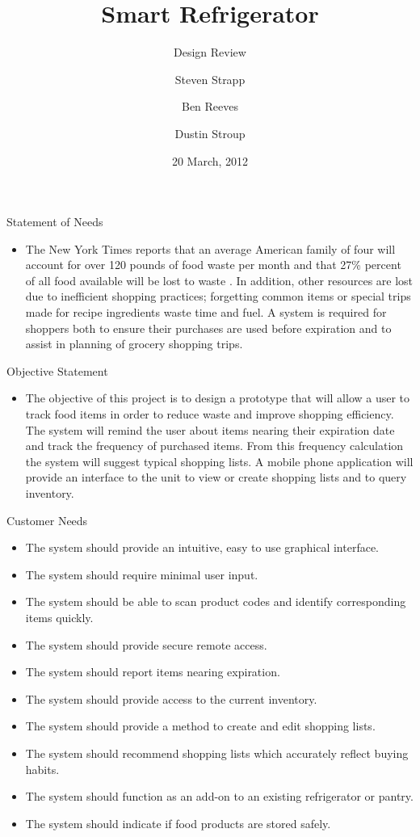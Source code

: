 \documentclass{beamer}
\title[Smart Refrigerator: Design Review] %
{Smart Refrigerator}
\subtitle
{Design Review} %
\author[Steven Strapp, Ben Reeves, Dustin Stroup] %
{Steven Strapp \and Ben Reeves \and Dustin Stroup}
\date[20 March, 2012] %
{20 March, 2012}
\begin{document}
\begin{frame}
  \titlepage
\end{frame}

\begin{frame}{Statement of Needs}
\Large
\begin{itemize}
\item The New York Times reports that an average American family of four will account for over 120 pounds of food waste per month and that 27\% percent of all food available will be lost to waste \cite{times}. In addition, other resources are lost due to inefficient shopping practices; forgetting common items or special trips made for recipe ingredients waste time and fuel. A system is required for shoppers both to ensure their purchases are used before expiration and to assist in planning of grocery shopping trips.
\end{itemize}
\end{frame}

\begin{frame}{Objective Statement}
\Large
\begin{itemize}
\item The objective of this project is to design a prototype that will allow a user to track food items in order to reduce waste and improve shopping efficiency. The system will remind the user about items nearing their expiration date and track the frequency of purchased items. From this frequency calculation the system will suggest typical shopping lists. A mobile phone application will provide an interface to the unit to view or create shopping lists and to query inventory.
\end{itemize}
\end{frame}

\begin{frame}{Customer Needs}
\footnotesize
\begin{itemize}
\item The system should provide an intuitive, easy to use graphical interface.
\item The system should require minimal user input.
\item The system should be able to scan product codes and identify corresponding items quickly.
\item The system should provide secure remote access.
\item The system should report items nearing expiration.
\item The system should provide access to the current inventory.
\item The system should provide a method to create and edit shopping lists.
\item The system should recommend shopping lists which accurately reflect buying habits.
\item The system should function as an add-on to an existing refrigerator or pantry.
\item The system should indicate if food products are stored safely.
\end{itemize}
\end{frame}
\end{document}
